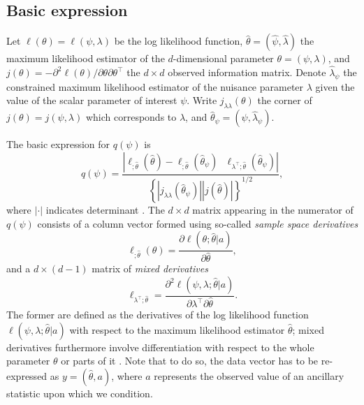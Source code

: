 \documentclass[a4paper,11pt]{article}
\begin{document}
\subsection*{Basic expression}
%
Let $\ell(\theta)=\ell(\psi,\lambda)$ be the log likelihood function, $\hat\theta = (\hat\psi,\hat\lambda)$ the maximum likelihood estimator of the $d$-dimensional parameter $\theta = (\psi,\lambda)$, and $j(\theta) = -\partial^2\ell(\theta)/\partial\theta\partial\theta^\top$ the $d\times d$ observed information matrix.  Denote $\hat\lambda_\psi$ the constrained maximum likelihood estimator of the nuisance parameter $\lambda$ given the value of the scalar parameter of interest $\psi$.  Write $j_{\lambda\lambda}(\theta)$ the corner of $j(\theta) = j(\psi,\lambda)$ which corresponds to $\lambda$, and $\hat\theta_\psi = (\psi, \hat\lambda_\psi)$.  

The basic expression for $q(\psi)$ is
%
\begin{equation}
\label{eq:qterm}
q(\psi) = \frac{| \ell_{;\hat\theta}(\hat\theta) - \ell_{;\hat\theta}(\hat\theta_\psi) 
              \ \ \ 
              \ell_{\lambda^\top;\hat\theta}(\hat\theta_\psi) |}
               {\left\{| j_{\lambda\lambda}(\hat\theta_\psi) | | j(\hat\theta) |\right\}^{1/2}},
\end{equation}
%
where $|\cdot|$ indicates determinant \citep[Section~7.4.1]{severini:2000}.  The $d\times d$ matrix appearing in the numerator of $q(\psi)$ consists of a column vector formed using so-called \emph{sample space derivatives}
%
\[
\ell_{;\hat\theta}(\theta) = \frac{\partial\ell(\theta;\hat\theta|a)}{\partial\hat\theta},
\]
%
and a $d\times (d-1)$ matrix of \emph{mixed derivatives}
%
\[
\ell_{\lambda^\top;\hat\theta} = \frac{\partial^2\ell(\psi,\lambda;\hat\theta|a)}{\partial\lambda^\top\partial\hat\theta}.
\]
%
The former are defined as the derivatives of the log likelihood function $\ell(\psi,\lambda;\hat\theta|a)$ with respect to the maximum likelihood estimator $\hat\theta$; mixed derivatives furthermore involve differentiation with respect to the whole parameter $\theta$ or parts of it \citep[Section~6.2.1]{severini:2000}.  Note that to do so, the data vector has to be re-expressed as $y = (\hat\theta, a)$, where $a$ represents the observed value of an ancillary statistic upon which we condition.     
\end{document}
